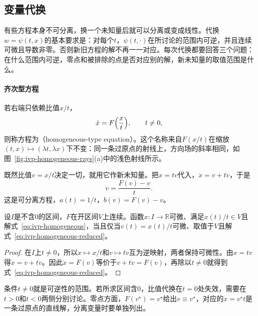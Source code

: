 \subsection{变量代换}
\label{sec:ivp-substitution}

有些方程本身不可分离，换一个未知量后就可以分离或变成线性。代换$w=\psi(t,x)$的基本要求是：对每个$t$，$\psi(t,\cdot)$在所讨论的范围内可逆，并且连续可微且导数非零。否则新旧方程的解不再一一对应。每次代换都要回答三个问题：在什么范围内可逆，零点和被排除的点是否对应别的解，新未知量的取值范围是什么。

\paragraph{齐次型方程}
若右端只依赖比值$x/t$，
\begin{equation}
 \dot{x}=F\Bigl(\frac{x}{t}\Bigr),\qquad t\neq 0,
 \label{eq:ivp-homogeneous}
\end{equation}
则称方程为（homogeneous-type equation）。这个名称来自$F(x/t)$在缩放$(t,x)\mapsto(\lambda t,\lambda x)$下不变：同一条过原点的射线上，方向场的斜率相同，如图~\ref{fig:ivp-homogeneous-rays}(a)中的浅色射线所示。

既然比值$v=x/t$决定一切，就用它作新未知量。把$x=tv$代入，$\dot{x}=v+t\dot{v}$，于是
\begin{equation}
 \dot{v}=\frac{F(v)-v}{t}.
 \label{eq:ivp-homogeneous-reduced}
\end{equation}
这是可分离方程，$a(t)=1/t$，$b(v)=F(v)-v$。

\begin{lemma}[比例代换的可逆性]
 \label{lem:ivp-homogeneous}
 设$I$是不含$0$的区间，$F$在开区间$V$上连续。函数$x:I\to\mathbb{R}$可微、满足$x(t)/t\in V$且解式~\eqref{eq:ivp-homogeneous}，当且仅当$v(t)=x(t)/t$可微、取值于$V$且解式~\eqref{eq:ivp-homogeneous-reduced}。
\end{lemma}

\begin{proof}
 在$I$上$t\neq 0$，所以$x\mapsto x/t$和$v\mapsto tv$互为逆映射，两者保持可微性。由$x=tv$得$\dot{x}=v+t\dot{v}$。因此$\dot{x}=F(v)$等价于$v+t\dot{v}=F(v)$，再除以$t\neq 0$就得到式~\eqref{eq:ivp-homogeneous-reduced}。
\end{proof}

条件$t\neq 0$就是可逆性的范围。若所求区间含$0$，比值代换在$t=0$处失效，需要在$t>0$和$t<0$两侧分别讨论。零点方面，$F(v^{\star})=v^{\star}$给出$v\equiv v^{\star}$，对应的$x=v^{\star}t$是一条过原点的直线解，分离变量时要单独列出。

